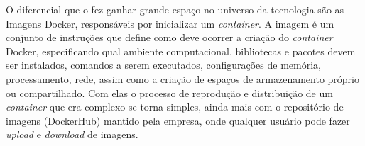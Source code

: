 O diferencial que o fez ganhar grande espaço no universo da tecnologia são as Imagens Docker, responsáveis por inicializar um \textit{container}. A imagem é um conjunto de instruções que define como deve ocorrer a criação do \textit{container} Docker, especificando qual ambiente computacional, bibliotecas e pacotes devem ser instalados, comandos a serem executados, configurações de memória, processamento, rede, assim como a criação de espaços de armazenamento próprio ou compartilhado. Com elas o processo de reprodução e distribuição de um \textit{container} que era complexo se torna simples, ainda mais com o repositório de imagens (DockerHub) mantido pela empresa, onde qualquer usuário pode fazer \textit{upload} e \textit{download} de imagens.



